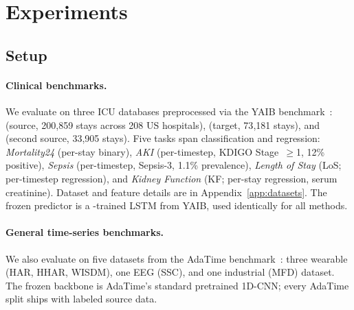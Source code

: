 
\section{Experiments}
\label{sec:experiments}

\subsection{Setup}
\label{sec:setup}

\vspace{-0.3em}
\paragraph{Clinical benchmarks.}
We evaluate on three ICU databases preprocessed via the YAIB benchmark~\citep{vandewater2024yaib}: \eicu{} (source, 200{,}859 stays across 208 US hospitals), \mimic{} (target, 73{,}181 stays), and \hirid{} (second source, 33{,}905 stays).
Five tasks span classification and regression: \emph{Mortality24} (per-stay binary), \emph{AKI} (per-timestep, KDIGO Stage~$\geq$1, 12\% positive), \emph{Sepsis} (per-timestep, Sepsis-3, 1.1\% prevalence), \emph{Length of Stay} (LoS; per-timestep regression), and \emph{Kidney Function} (KF; per-stay regression, serum creatinine).
Dataset and feature details are in Appendix~\ref{app:datasets}.
The frozen predictor is a \mimic{}-trained LSTM from YAIB, used identically for all methods.

\vspace{-0.5em}
\paragraph{General time-series benchmarks.}
We also evaluate on five datasets from the AdaTime benchmark~\citep{ragab2023adatime}: three wearable (HAR, HHAR, WISDM), one EEG (SSC), and one industrial (MFD) dataset.
The frozen backbone is AdaTime's standard pretrained 1D-CNN; every AdaTime split ships with labeled source data.

\vspace{-0.5em}
